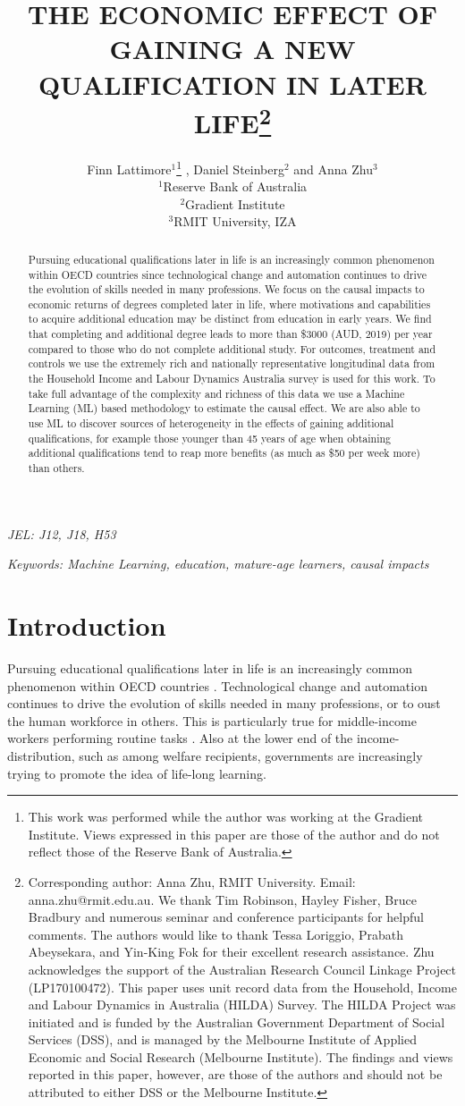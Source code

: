 \documentclass[12pt, a4paper]{article}
\title{THE ECONOMIC EFFECT OF GAINING A NEW QUALIFICATION IN LATER LIFE\thanks{\scriptsize{Corresponding author: Anna Zhu, RMIT University. Email: anna.zhu@rmit.edu.au. \newline \newline We thank Tim Robinson, Hayley Fisher, Bruce Bradbury and numerous seminar and conference participants for helpful comments. The authors would like to thank Tessa Loriggio, Prabath Abeysekara, and Yin-King Fok for their excellent research assistance. \newline \newline Zhu acknowledges the support of the Australian Research Council Linkage Project (LP170100472). This paper uses unit record data from the Household, Income and Labour Dynamics in Australia (HILDA) Survey. The HILDA Project was initiated and is funded by the Australian Government Department of Social Services (DSS), and is managed by the Melbourne Institute of Applied Economic and Social Research (Melbourne Institute). The findings and views reported in this paper, however, are those of the authors and should not be attributed to either DSS or the Melbourne Institute.}}} \vspace{0.2cm} \author{Finn Lattimore$^1$\thanks{\scriptsize{This work was performed while the author was working at the Gradient Institute. Views expressed in this paper are those of the author and do not reflect those of the Reserve Bank of Australia.}}\vspace{0.2cm} ,  Daniel Steinberg$^2$ and Anna Zhu$^3$ \\\small {$^1$Reserve Bank of Australia} \vspace{0.2cm} \\ {$^2$Gradient Institute} \vspace{0.2cm} \\ {$^3$RMIT University, IZA}}
\begin{document}

\maketitle


\begin{abstract}

  Pursuing educational qualifications later in life is an increasingly common
  phenomenon within OECD countries since technological change and automation
  continues to drive the evolution of skills needed in many professions. We
  focus on the causal impacts to economic returns of degrees completed later in
  life, where motivations and capabilities to acquire additional education may
  be distinct from education in early years. We find that completing and
  additional degree leads to more than \$3000 (AUD, 2019) per year compared to
  those who do not complete additional study. For outcomes, treatment and
  controls we use the extremely rich and nationally representative longitudinal
  data from the Household Income and Labour Dynamics Australia survey is used
  for this work. To take full advantage of the complexity and richness of this
  data we use a Machine Learning (ML) based methodology to estimate the causal
  effect. We are also able to use ML to discover sources of heterogeneity in
  the effects of gaining additional qualifications, for example those younger
  than 45 years of age when obtaining additional qualifications tend to reap
  more benefits (as much as \$50 per week more) than others.

\end{abstract}


\emph{JEL: J12, J18, H53}

\emph{Keywords: Machine Learning, education, mature-age learners, causal impacts}


\clearpage
\onehalfspacing


\section{Introduction}

Pursuing educational qualifications later in life is an increasingly common
phenomenon within OECD countries \citep{oecd2016}. Technological change and
automation continues to drive the evolution of skills needed in many
professions, or to oust the human workforce in others. This is particularly
true for middle-income workers performing routine tasks
\citep{autor2008,acemoglu2011}. Also at the lower end of the
income-distribution, such as among welfare recipients, governments are
increasingly trying to promote the idea of life-long learning.
\end{document}

